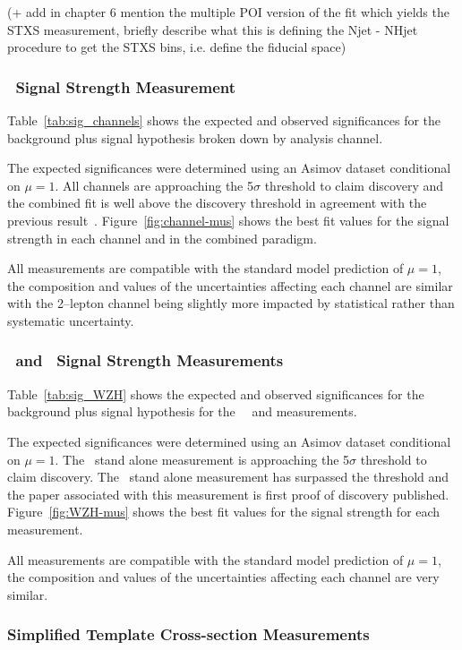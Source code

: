 (+ add in chapter 6 mention the multiple POI version of the fit which yields the
STXS measurement, briefly describe what this is defining the Njet - NHjet
procedure to get the STXS bins, i.e. define the fiducial space)


\subsubsection{\VH\ Signal Strength Measurement}
Table~\ref{tab:sig_channels} shows the expected and observed significances for
the background plus signal hypothesis broken down by analysis channel.

The expected significances were determined using an Asimov dataset conditional
on $\mu=1$. All channels are approaching the 5$\sigma$ threshold to claim
discovery and the combined fit is well above the discovery threshold in
agreement with the previous result~\cite{vhbb-obs}. Figure~\ref{fig:channel-mus}
shows the best fit values for the signal strength in each channel and in the
combined paradigm.

All measurements are compatible with the standard model prediction of $\mu=1$,
the composition and values of the uncertainties affecting each channel are
similar with the 2--lepton channel being slightly more impacted by statistical
rather than systematic uncertainty.
%

\subsubsection{\WH\ and \ZH\ Signal Strength Measurements}
Table~\ref{tab:sig_WZH} shows the expected and observed significances for
the background plus signal hypothesis for the \WH\, \ZH\ and \VH measurements.

The expected significances were determined using an Asimov dataset conditional
on $\mu=1$. The \WH\ stand alone measurement is approaching the 5$\sigma$
threshold to claim discovery. The \ZH\ stand alone measurement has surpassed the
threshold and the paper associated with this measurement is first proof of
discovery published. Figure~\ref{fig:WZH-mus}
shows the best fit values for the signal strength for each measurement.

All measurements are compatible with the standard model prediction of $\mu=1$,
the composition and values of the uncertainties affecting each channel are very
similar.
\clearpage

\subsubsection{Simplified Template Cross-section Measurements}




